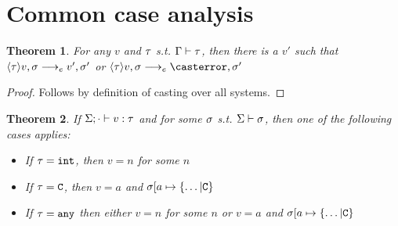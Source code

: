 \documentclass{report}
\newtheorem{thm}{Theorem}
\begin{document}
\section{Common case analysis}
\begin{thm} 
\label{castv}For any $v$ and $\tau$ s.t. $\Gamma\vdash \tau$, then there is a $v'$ such that $\langle \tau\rangle v,\sigma \longrightarrow_{e} v',\sigma'$ or $\cast{\t}v,\s \ereduce \casterror,\s'$\end{thm}
\begin{proof}
Follows by definition of casting over all systems.
\end{proof}

\begin{thm}
\label{canonforms}If $\Sigma;\cdot \vdash v : \tau$ and for some $\sigma$ s.t. $\Sigma \vdash \sigma$, then one of the following cases applies:
\begin{itemize}
\item If $\tau = \texttt{int}$, then $v = n$ for some $n$
\item If $\tau = \texttt{C}$, then $v = a$ and $\sigma[a \mapsto \{\ldots | \texttt{C} \}$
\item If $\tau = \texttt{any}$ then either $v = n$ for some $n$ or $v = a$ and $\sigma[a \mapsto \{\ldots | \texttt{C} \}$
\end{itemize}
\end{thm}
\end{document}
